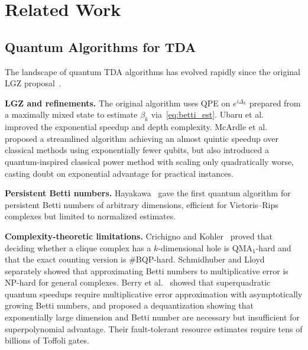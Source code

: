 \documentclass[conference,10pt]{IEEEtran}
\begin{document}
\section{Related Work}\label{sec:related}

\subsection{Quantum Algorithms for TDA}

The landscape of quantum TDA algorithms has evolved rapidly since the
original LGZ proposal~\cite{lloyd2016quantum}.

\textbf{LGZ and refinements.} The original algorithm uses QPE on
$e^{i\Delta_k}$ prepared from a maximally mixed state to estimate
$\beta_k$ via~\eqref{eq:betti_est}. Ubaru et al.~\cite{Ubaru21}
improved the exponential speedup and depth complexity. McArdle et
al.~\cite{McArdle22} proposed a streamlined algorithm achieving an
almost quintic speedup over classical methods using exponentially
fewer qubits, but also introduced a quantum-inspired classical power
method with scaling only quadratically worse, casting doubt on
exponential advantage for practical instances.

\textbf{Persistent Betti numbers.} Hayakawa~\cite{Hayakawa22} gave the
first quantum algorithm for persistent Betti numbers of arbitrary
dimensions, efficient for Vietoris--Rips complexes but limited to
normalized estimates.

\textbf{Complexity-theoretic limitations.} Crichigno and
Kohler~\cite{CrichignoKohler24} proved that deciding whether a clique
complex has a $k$-dimensional hole is QMA$_1$-hard and that the exact
counting version is \#BQP-hard. Schmidhuber and Lloyd~\cite{Schmidhuber23}
separately showed that approximating Betti numbers to multiplicative
error is NP-hard for general complexes.
Berry et al.~\cite{Berry24} showed that superquadratic quantum
speedups require multiplicative error approximation with asymptotically
growing Betti numbers, and proposed a dequantization showing that
exponentially large dimension and Betti number are necessary but
insufficient for superpolynomial advantage. Their fault-tolerant
resource estimates require tens of billions of Toffoli gates.
\end{document}
